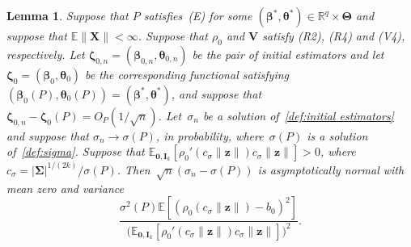 \documentclass{article}
\numberwithin{equation}{section}
\theoremstyle{plain}
\newtheorem{lemma}{Lemma}
\newcommand{\R}{\mathbb{R}}
\newcommand{\bbeta}{\bm\beta}
\newcommand{\btheta}{\bm\theta}
\newcommand{\bSigma}{\mathbf{\Sigma}}
\newcommand{\bTheta}{\bm\Theta}
\newcommand{\bzeta}{\bm\zeta}
\newcommand{\bz}{\mathbf{z}}
\newcommand{\bX}{\mathbf{X}}
\newcommand{\bV}{\mathbf{V}}
\newcommand{\bI}{\mathbf{I}}
\newcommand{\E}{\mathbb{E}}
\begin{document}
\begin{lemma}
\label{lem:asym norm sigma}
Suppose that $P$ satisfies~(E) for some $(\bbeta^*,\btheta^*)\in\R^q\times\bTheta$
and suppose that $\E\|\bX\|<\infty$.
Suppose that $\rho_0$ and $\bV$ satisfy (R2), (R4) and (V4), respectively.
Let $\bzeta_{0,n}=(\bbeta_{0,n},\btheta_{0,n})$ be the pair of initial estimators
and let $\bzeta_0=(\bbeta_0,\btheta_0)$ be the corresponding functional 
satisfying $(\bbeta_0(P),\btheta_0(P))=(\bbeta^*,\btheta^*)$, and suppose that $\bzeta_{0,n}-\bzeta_0(P)=O_P(1/\sqrt{n})$.
Let~$\sigma_n$ be a solution of~\eqref{def:initial estimators} 
and suppose that $\sigma_n\to\sigma(P)$, in probability,
where~$\sigma(P)$ is a solution of~\eqref{def:sigma}.
Suppose that $\E_{\mathbf{0},\bI_k}[\rho_0'(c_\sigma\|\bz\|)c_\sigma\|\bz\|]>0$,
where $c_\sigma=|\bSigma|^{1/(2k)}/\sigma(P)$.
Then~$\sqrt{n}(\sigma_n-\sigma(P))$ is asymptotically normal with mean zero and variance
\[
\frac{\sigma^2(P)\E\left[(\rho_0(c_\sigma\|\bz\|)-b_0)^2\right]}{\big(\E_{\mathbf{0},\bI_k}[\rho_0'(c_\sigma\|\bz\|)c_\sigma\|\bz\|]\big)^2}.
\]
\end{lemma}
\end{document}
